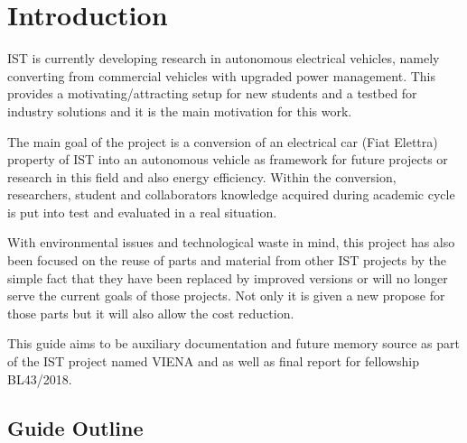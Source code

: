 
\chapter{Introduction}
\label{chapter:introduction}

\gls{IST} is currently developing research in autonomous electrical vehicles, namely converting from commercial vehicles with upgraded power management.
This provides a motivating/attracting setup for new students and a testbed for industry solutions and it is the main motivation for this work.

The main goal of the project is a conversion of an electrical car (Fiat Elettra) property of \gls{IST} into an autonomous vehicle as framework for future projects or research in this field and also energy efficiency. Within the conversion, researchers, student and collaborators knowledge acquired during academic cycle is put into test and evaluated in a real situation. 

With environmental issues and technological waste in mind, this project has
also been focused on the reuse of parts and material from
other \gls{IST} projects by the simple fact that they have been replaced by improved versions or will no longer serve the current goals of those projects. Not only it is given a new propose for those parts but it will also allow the cost reduction.

This guide aims to be auxiliary documentation and future memory source as part of the \gls{IST} project named \gls{VIENA} and as well as final report for fellowship BL43/2018. 




\section{Guide Outline}
\label{section:outline} 

